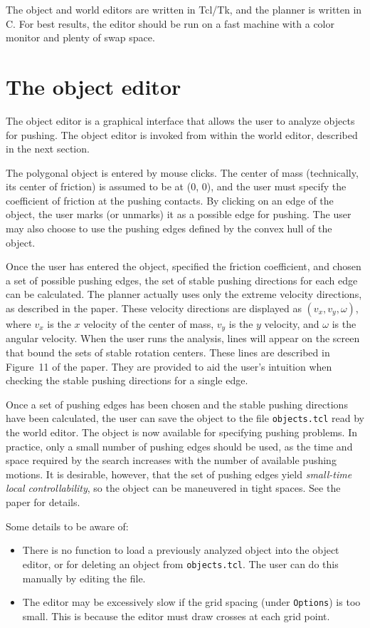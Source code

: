 The object and world editors are written in Tcl/Tk, and the planner is
written in C.  For best results, the editor should be run on a fast machine
with a color monitor and plenty of swap space.

\section{The object editor}

The object editor is a graphical interface that allows the user to
analyze objects for pushing.  The object editor is invoked from within the
world editor, described in the next section.  

The polygonal object is entered by mouse clicks.  The center of mass
(technically, its center of friction)
is assumed to be at (0, 0), and the user must specify
the coefficient of friction at the pushing contacts.  By clicking on
an edge of the object, the user marks (or unmarks) it as a possible
edge for pushing.  The user may also choose to use the pushing edges
defined by the convex hull of the object.

Once the user has entered the object, specified the friction coefficient,
and chosen a set of possible pushing edges, the set of stable pushing
directions for each edge can be calculated.  The planner actually uses
only the extreme velocity directions, as described in the paper.   
These velocity directions are displayed as $(v_x, v_y, \omega)$, where
$v_x$ is the $x$ velocity of the center of mass, $v_y$ is the $y$ velocity,
and $\omega$ is the angular velocity.  
When the user runs the analysis, lines will appear on the screen
that bound the sets of stable rotation centers.  These lines are described
in Figure~11 of the paper.  They are provided to aid the user's intuition
when checking the stable pushing directions for a single edge. 

Once a set of pushing edges has been chosen and the stable pushing
directions have been calculated, the user can save the object to the
file {\tt objects.tcl} read by the world editor.  The object is now
available for specifying pushing problems.  In practice, only a small
number of pushing edges should be used, as the time and space required
by the search increases with the number of available pushing motions.
It is desirable, however, that the set of pushing edges yield {\em
small-time local controllability\/}, so the object can be
maneuvered in tight spaces.  See the paper for details.

Some details to be aware of:
\begin{itemize}
\item There is no function to load a previously analyzed object into the
object editor, or for deleting an object from {\tt objects.tcl}.
The user can do this manually by editing the file.
\item The editor may be excessively slow if the grid spacing (under
{\tt Options}) is too small.  This is because the editor must draw crosses
at each grid point.
\end{itemize}

